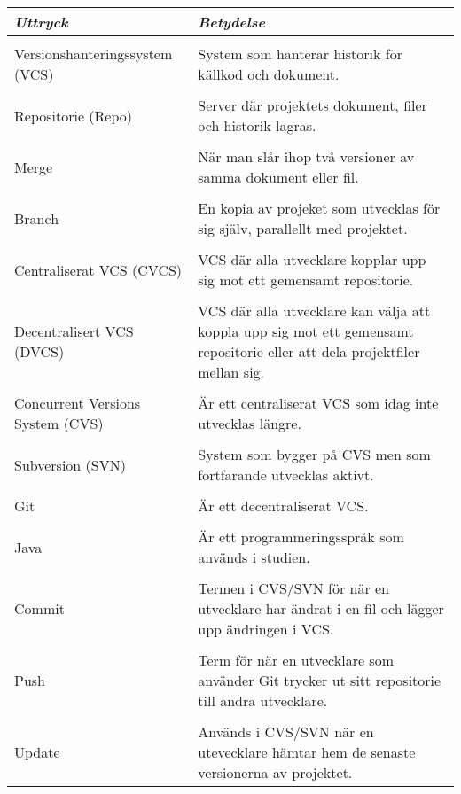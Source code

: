 \begin{table}

\begin{tabular}{ | l |  p{7cm} |}
\hline
\emph{Uttryck}	 & \emph{Betydelse} \\ \hline \hline \\
Versionshanteringssystem (VCS) &	System som  hanterar historik för källkod och dokument. \\ \hline 
 \\Repositorie (Repo) &	Server där projektets dokument, filer och historik lagras. \\ \hline 
 \\ Merge	& När man slår ihop två versioner av samma dokument eller fil. \\ \hline 
\\Branch & En kopia av projeket som utvecklas för sig själv, parallellt med projektet.  \\ \hline
\\Centraliserat VCS (CVCS) &	VCS där alla utvecklare kopplar upp sig mot ett gemensamt repositorie. \\ \hline
\\Decentralisert VCS (DVCS) &	VCS där alla utvecklare kan välja att koppla upp sig mot ett gemensamt repositorie eller att dela projektfiler mellan sig. \\ \hline
\\Concurrent Versions System (CVS) &	Är ett centraliserat VCS som idag inte utvecklas längre. \\ \hline
\\Subversion (SVN) &	System som bygger på CVS men som fortfarande utvecklas aktivt. \\ \hline
\\Git &	Är ett decentraliserat VCS. \\ \hline
\\Java &	Är ett programmeringsspråk som används i studien. \\ \hline
\\Commit &	Termen i CVS/SVN för när en utvecklare har ändrat i en fil och lägger upp ändringen i VCS. \\ \hline
\\Push &	Term för när en utvecklare som använder Git trycker ut sitt repositorie till andra utvecklare. \\ \hline
\\Update &	Används i CVS/SVN när en utevecklare hämtar hem de senaste versionerna av projektet. \\ \hline

\end{tabular}
\end{table}
